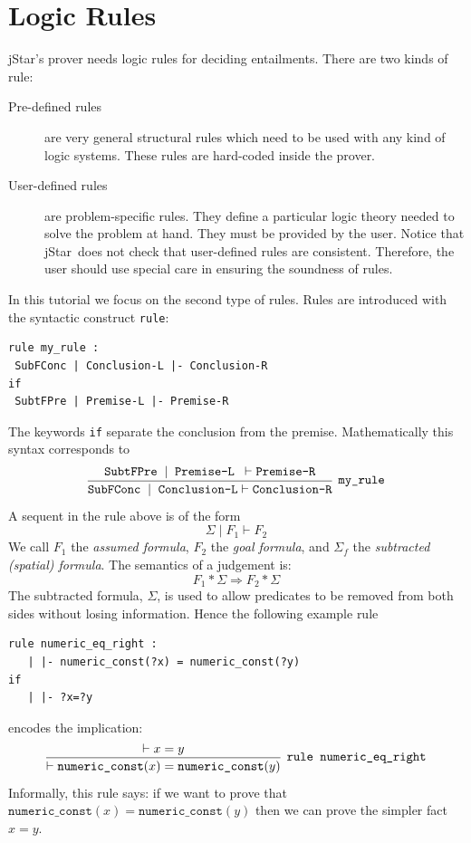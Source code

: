 \documentclass[11pt]{article}
\newcommand{\jStar}{{\sf jStar}}
\begin{document}
\section{Logic Rules}
\label{sec:logic-rules}
\jStar's  prover needs logic rules for deciding entailments. There are
two kinds of rule:
%
\begin{description}
\item[Pre-defined rules] are very general structural rules which need
  to be used with any kind of logic systems. These
  rules are hard-coded inside the prover.
\item[User-defined rules] are problem-specific rules. They define a
  particular logic theory needed to solve the problem at hand. They
  must be provided by the user. Notice that \jStar \ does not check that user-defined rules are 
  consistent. Therefore, the user should use special care in ensuring the soundness of rules.
\end{description} 
In this tutorial we focus on the second type of rules. Rules are introduced with
the syntactic construct {\tt rule}:
\begin{verbatim}
rule my_rule :
 SubFConc | Conclusion-L |- Conclusion-R 
if 
 SubtFPre | Premise-L |- Premise-R
  \end{verbatim}
The keywords {\tt if} separate the conclusion from the premise.
Mathematically this syntax corresponds to
\[
\infer[\texttt{my\_rule}]
{ \texttt{SubFConc} \; \mid \; \texttt{Conclusion-L}  \vdash   \texttt{Conclusion-R} }
{ \texttt{SubtFPre} \; \mid \; \texttt{Premise-L } \vdash   \texttt{Premise-R}} 
\]
A sequent in the rule above is of the form
\[
\Sigma \mid F_1 \vdash F_2
\]
We call $F_1$ the \emph{assumed formula}, $F_2$ the \emph{goal formula}, and $\Sigma_f$ the \emph{subtracted (spatial)
formula}. The semantics of a judgement is:
\[
F_1 *\Sigma  \Longrightarrow F_2 * \Sigma
\]
The subtracted formula, $\Sigma$, is used to allow predicates to be
removed from both sides without losing information. Hence the 
following example rule 
\begin{verbatim}
rule numeric_eq_right :
   | |- numeric_const(?x) = numeric_const(?y) 
if
   | |- ?x=?y
\end{verbatim}
encodes the implication:
\[
\infer[\texttt{rule numeric\_eq\_right}]{ \vdash \texttt{numeric\_const}(x) = \texttt{numeric\_const}(y)}{ \vdash x=y}
\]
Informally, this rule says: if we want to prove that $\texttt{numeric\_const}(x) = \texttt{numeric\_const}(y)$ then we can prove the simpler fact $x=y$.
\end{document}
